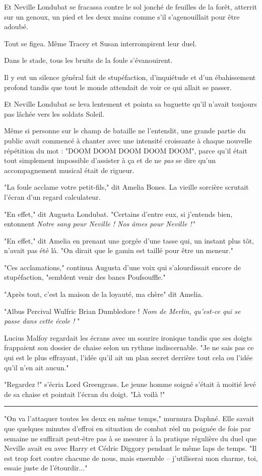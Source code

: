 Et Neville Londubat se fracassa contre le sol jonché de feuilles de la forêt, atterrit sur un genoux, un pied et les deux mains comme s'il s'agenouillait pour être adoubé.

Tout se figea. Même Tracey et Susan interrompirent leur duel.

Dans le stade, tous les bruits de la foule s'évanouirent.

Il y eut un silence général fait de stupéfaction, d'inquiétude et d'un ébahissement profond tandis que tout le monde attendait de voir ce qui allait se passer.

Et Neville Londubat se leva lentement et pointa sa baguette qu'il n'avait toujours pas lâchée vers les soldats Soleil.

Même si personne sur le champ de bataille ne l'entendit, une grande partie du public avait commencé à chanter avec une intensité croissante à chaque nouvelle répétition du mot : "DOOM DOOM DOOM DOOM DOOM", parce qu'il était tout simplement impossible d'assister à ça et de ne \emph{pas}  se dire qu'un accompagnement musical était de rigueur.

"La foule acclame votre petit-fils," dit Amelia Bones. La vieille sorcière scrutait l'écran d'un regard calculateur.

"En effet," dit Augusta Londubat. "Certains d'entre eux, si j'entends bien, entonnent \emph{Notre sang pour Neville ! Nos âmes pour Neville !"} 

"En effet," dit Amelia en prenant une gorgée d'une tasse qui, un instant plus tôt, n'avait pas été là. "On dirait que le gamin est taillé pour être un meneur."

"Ces acclamations," continua Augusta d'une voix qui s'alourdissait encore de stupéfaction, "semblent venir des bancs Poufsouffle."

"Après tout, c'est la maison de la loyauté, ma chère" dit Amelia.

"Albus Percival Wulfric Brian Dumbledore ! \emph{Nom de Merlin, qu'est-ce qui se passe dans cette école !} "

Lucius Malfoy regardait les écrans avec un sourire ironique tandis que ses doigts frappaient son dossier de chaise selon un rythme indiscernable. "Je ne sais pas ce qui est le plus effrayant, l'idée qu'il ait un plan secret derrière tout cela ou l'idée qu'il n'en ait aucun."

"Regardez !" s'écria Lord Greengrass. Le jeune homme soigné s'était à moitié levé de sa chaise et pointait l'écran du doigt. "Là voilà !"
\par\noindent\rule{\textwidth}{0.4pt}
"On va l'attaquer toutes les deux en même temps," murmura Daphné. Elle savait que quelques minutes d'effroi en situation de combat réel un poignée de fois par semaine ne suffirait peut-être pas à se mesurer à la pratique régulière du duel que Neville avait eu avec Harry et Cédric Diggory pendant le même laps de temps. "Il est trop fort contre chacune de nous, mais ensemble – j'utiliserai mon charme, toi, essaie juste de l'étourdir..."

